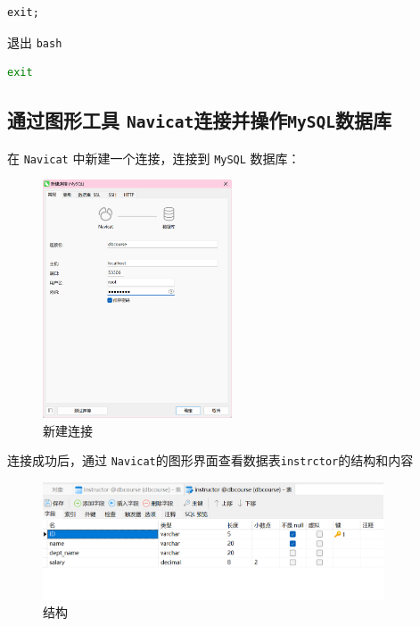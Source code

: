 \documentclass{article}
\begin{document}
\begin{lstlisting}[language=sql]
exit;
\end{lstlisting}

退出 \texttt{bash}

\begin{lstlisting}[language=bash]
exit
\end{lstlisting}

\subsection{通过图形工具 \texttt{Navicat}连接并操作\texttt{MySQL}数据库}

在 \texttt{Navicat} 中新建一个连接，连接到 \texttt{MySQL} 数据库：

\begin{figure}[H]
\centering
\includegraphics[width=0.5\textwidth]{img/21.png}
\caption{新建连接}
\end{figure}

连接成功后，通过 \texttt{Navicat}的图形界面查看数据表\texttt{instrctor}的结构和内容

\begin{figure}[H]
\centering
\includegraphics[width=0.9\textwidth]{img/22.png}
\caption{结构}
\end{figure}
\end{document}
